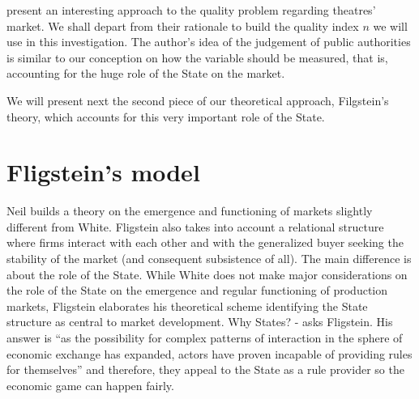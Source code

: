 \documentclass[a4paper, 12pt, openright, oneside, german, french, brazil, english]{abntex2}
\begin{document}
	 present an interesting approach to the quality problem regarding theatres' market. We shall depart from their rationale to build the quality index $n$ we will use in this investigation. The author's idea of the judgement of public authorities is similar to our conception on how the variable should be measured, that is, accounting for the huge role of the State on the market.
	
		
	
		
	We will present next the second piece of our theoretical approach, Filgstein's theory, which accounts for this very important role of the State.
	
	\section{Fligstein's model}
	
	
	
	Neil  builds a theory on the emergence and functioning of markets slightly different from White. Fligstein also takes into account a relational structure where firms interact with each other and with the generalized buyer seeking the stability of the market (and consequent subsistence of all). The main difference is about the role of the State. While White does not make major considerations on the role of the State on the emergence and regular functioning of production markets, Fligstein elaborates his theoretical scheme identifying the State structure as central to market development. Why States? - asks Fligstein. His answer is ``as the possibility for complex patterns of interaction in the sphere of economic exchange has expanded, actors have proven incapable of providing rules for themselves'' \cite[p. 27-8]{fligstein2002architecture} and therefore, they appeal to the State as a rule provider so the economic game can happen fairly.
\end{document}
